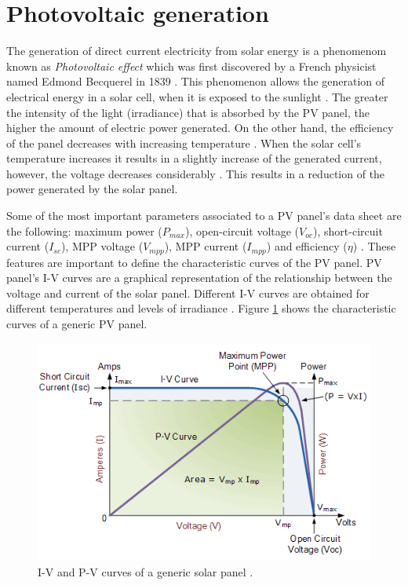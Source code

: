 \section{Photovoltaic generation}

The generation of direct current electricity from solar energy is a phenomenom known as \textit{Photovoltaic effect} which was first discovered by a French physicist named Edmond Becquerel in 1839 \cite{PVeffect}. This phenomenon allows the generation of electrical energy in a solar cell, when it is exposed to the sunlight \cite{PVeffect}. The greater the intensity of the light (irradiance) that is absorbed by the PV panel, the higher the amount of electric power generated. On the other hand, the efficiency of the panel decreases with increasing temperature \cite{handbook}. When the solar cell's temperature increases it results in a slightly increase of the generated current, however, the voltage decreases considerably \cite{handbook}. This results in a reduction of the power generated by the solar panel.

Some of the most important parameters associated to a PV panel’s data sheet are the following: maximum power ($P_{max}$), open-circuit voltage ($V_{oc}$), short-circuit current ($I_{sc}$), MPP voltage ($V_{mpp}$), MPP current ($I_{mpp}$) and efficiency ($\eta$) \cite{handbook}.
These features are important to define the characteristic curves of the PV panel. PV panel's I-V curves are a graphical representation of the relationship between the voltage and current of the solar panel. Different I-V curves are obtained for different temperatures and levels of irradiance \cite{IVcurves}. Figure \ref{fig:mpp} shows the characteristic curves of a generic PV panel. 

\begin{figure}[H]
	\begin{center}
		\includegraphics[width=0.8\linewidth]{../Pictures/IVcurve1}
		\caption{I-V and P-V curves of a generic solar panel \cite{IVcurves}.}
		\label{fig:mpp}
	\end{center}
\end{figure}


